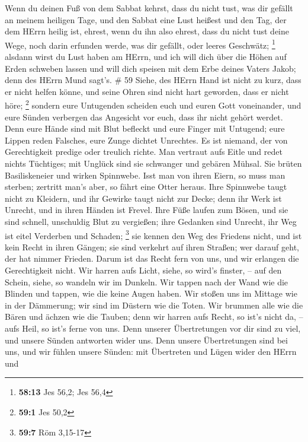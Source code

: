  Wenn du deinen Fuß von dem Sabbat kehrst, dass du nicht
tust, was dir gefällt an meinem heiligen Tage, und den Sabbat eine Lust
heißest und den Tag, der dem HErrn heilig ist, ehrest, wenn du ihn also
ehrest, dass du nicht tust deine Wege, noch darin erfunden werde, was
dir gefällt, oder leeres Geschwätz; \footnote{\textbf{58:13} Jes 56,2;
  Jes 56,4}  alsdann wirst du Lust haben am HErrn, und ich
will dich über die Höhen auf Erden schweben lassen und will dich speisen
mit dem Erbe deines Vaters Jakob; denn des HErrn Mund sagt's. \# 59
 Siehe, des HErrn Hand ist nicht zu kurz, dass er nicht
helfen könne, und seine Ohren sind nicht hart geworden, dass er nicht
höre; \footnote{\textbf{59:1} Jes 50,2}  sondern eure
Untugenden scheiden euch und euren Gott voneinander, und eure Sünden
verbergen das Angesicht vor euch, dass ihr nicht gehört werdet.
 Denn eure Hände sind mit Blut befleckt und eure Finger mit
Untugend; eure Lippen reden Falsches, eure Zunge dichtet Unrechtes.
 Es ist niemand, der von Gerechtigkeit predige oder treulich
richte. Man vertraut aufs Eitle und redet nichts Tüchtiges; mit Unglück
sind sie schwanger und gebären Mühsal.  Sie brüten
Basiliskeneier und wirken Spinnwebe. Isst man von ihren Eiern, so muss
man sterben; zertritt man's aber, so fährt eine Otter heraus.
 Ihre Spinnwebe taugt nicht zu Kleidern, und ihr Gewirke
taugt nicht zur Decke; denn ihr Werk ist Unrecht, und in ihren Händen
ist Frevel.  Ihre Füße laufen zum Bösen, und sie sind
schnell, unschuldig Blut zu vergießen; ihre Gedanken sind Unrecht, ihr
Weg ist eitel Verderben und Schaden; \footnote{\textbf{59:7} Röm 3,15-17}
 sie kennen den Weg des Friedens nicht, und ist kein Recht
in ihren Gängen; sie sind verkehrt auf ihren Straßen; wer darauf geht,
der hat nimmer Frieden.  Darum ist das Recht fern von uns,
und wir erlangen die Gerechtigkeit nicht. Wir harren aufs Licht, siehe,
so wird's finster, -- auf den Schein, siehe, so wandeln wir im Dunkeln.
 Wir tappen nach der Wand wie die Blinden und tappen, wie
die keine Augen haben. Wir stoßen uns im Mittage wie in der Dämmerung;
wir sind im Düstern wie die Toten.  Wir brummen alle wie
die Bären und ächzen wie die Tauben; denn wir harren aufs Recht, so
ist's nicht da, -- aufs Heil, so ist's ferne von uns.  Denn
unserer Übertretungen vor dir sind zu viel, und unsere Sünden antworten
wider uns. Denn unsere Übertretungen sind bei uns, und wir fühlen unsere
Sünden:  mit Übertreten und Lügen wider den HErrn und
